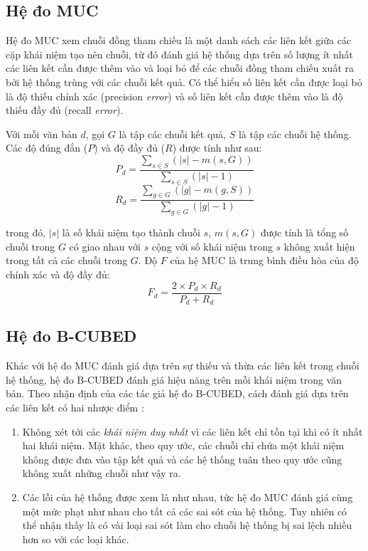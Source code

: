 \subsection*{Hệ đo MUC}
Hệ đo MUC \cite{MarcVilain1995} xem chuỗi đồng tham chiếu là một danh sách các liên kết giữa các cặp khái niệm tạo nên chuỗi, từ đó đánh giá hệ thống dựa trên số lượng ít nhất các liên kết cần được thêm vào và loại bỏ để các chuỗi đồng tham chiếu xuất ra bởi hệ thống trùng với các chuỗi kết quả. Có thể hiểu số liên kết cần được loại bỏ là độ thiếu chính xác (precision \emph{error}) và số liên kết cần được thêm vào là độ thiếu đầy đủ (recall \emph{error}). 

Với mỗi văn bản $d$, gọi $G$ là tập các chuỗi kết quả, $S$ là tập các chuỗi hệ thống. Các độ đúng đắn ($P$) và độ đầy đủ ($R$) được tính như sau:
\[P_d=\frac{\sum_{s\in S} \left(|s| - m(s, G)\right)}{\sum_{s\in S}\left(|s| - 1\right)}\]
\[R_d=\frac{\sum_{g\in G}(|g|-m(g,S))}{\sum_{g\in G}(|g|-1)}\]

\noindent trong đó, $|s|$ là số khái niệm tạo thành chuỗi $s$, $m(s,G)$ được tính là tổng số chuỗi trong $G$ có giao nhau với $s$ cộng với số khái niệm trong $s$ không xuất hiện trong tất cả các chuỗi trong $G$. Độ $F$ của hệ MUC là trung bình điều hòa của độ chính xác và độ đầy đủ:
\[F_d=\frac{2\times P_d\times R_d}{P_d + R_d}\]

\subsection*{Hệ đo B-CUBED}
Khác với hệ đo MUC đánh giá dựa trên sự thiếu và thừa các liên kết trong chuỗi hệ thống, hệ đo B-CUBED đánh giá hiệu năng trên mỗi khái niệm trong văn bản. Theo nhận định của các tác giả hệ đo B-CUBED, cách đánh giá dựa trên các liên kết có hai nhược điểm \cite{AmitBagga1998}:

\begin{enumerate}[leftmargin=\parindent]
\item Không xét tới các \emph{khái niệm duy nhất} vì các liên kết chỉ tồn tại khi có ít nhất hai khái niệm. Mặt khác, theo quy ước, các chuỗi chỉ chứa một khái niệm không được đưa vào tập kết quả và các hệ thống tuân theo quy ước cũng không xuất những chuỗi như vậy ra.

\item Các lỗi của hệ thống được xem là như nhau, tức hệ đo MUC đánh giá cùng một mức phạt như nhau cho tất cả các sai sót của hệ thống. Tuy nhiên có thể nhận thấy là có vài loại sai sót làm cho chuỗi hệ thống bị sai lệch nhiều hơn so với các loại khác.
\end{enumerate}

